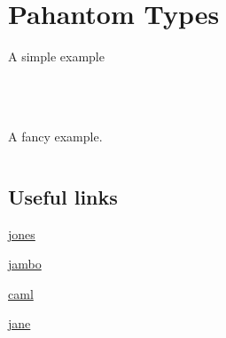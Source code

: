 \section{Pahantom Types}

A simple example

\inputminted[fontsize=\scriptsize]{ocaml}{lang/code/phantom_lambda.ml}
\inputminted[fontsize=\scriptsize]{ocaml}{lang/code/phantom_si.ml}
\inputminted[fontsize=\scriptsize]{ocaml}{lang/code/phantom_bat.ml}
\inputminted[fontsize=\scriptsize]{ocaml}{lang/code/phantom.ml}

A fancy example. 
\inputminted[fontsize=\scriptsize]{ocaml}{lang/code/phantom_dim_array.ml}



\subsection{Useful links}
\href{http://camltastic.blogspot.com/2008/05/phantom-types.html}{jones}

\href{http://www.quora.com/What-are-good-applications-of-phantom-types}{jambo}

\href{http://caml.inria.fr/pub/ml-archives/caml-list/2001/09/081c77179ee2a3787233902a51633122.en.html}{caml}

\href{https://ocaml.janestreet.com/?q=node/11}{jane}



